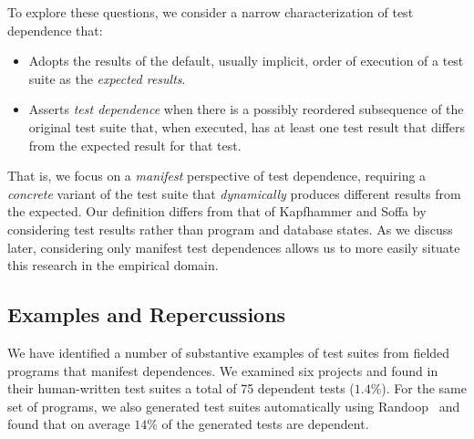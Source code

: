 To explore these questions, we consider a narrow characterization
of test dependence that:
\begin{itemize}
\item Adopts the results of the default, usually implicit,
  order of execution of a test suite as the \emph{expected results}. 
\item Asserts \emph{test dependence\/} when there is a possibly
  reordered subsequence of the original test suite that, when
  executed, has at least one test result that differs from the
  expected result for that test.  
\end{itemize}
That is, we focus on a \emph{manifest\/} perspective of test dependence,
requiring a \emph{concrete\/} variant of the test suite that
\emph{dynamically\/} produces different results from the expected.  Our
definition differs from that of Kapfhammer and Soffa by considering
test results rather than program and database states.
As we discuss later, considering only manifest test dependences allows
us to more easily situate this research in the empirical domain.


\subsection{Examples and Repercussions}

We have identified a number of substantive examples of test suites
from fielded programs that manifest dependences.
We examined
six projects and found in their human-written test suites a total
of 75 dependent tests ($1.4 \%$). For the same set of
programs, we also generated test suites automatically using
Randoop~\cite{PachecoLET2007} and found that on average $14 \%$ of
the generated tests are dependent.



